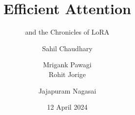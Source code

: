 \documentclass{beamer}
\title[Efficient Attention]
{Efficient Attention}
\subtitle{
    and the Chronicles of LoRA
}
\author[Chaudhary, Pawagi, Jorige, Nagasai]
{
    Sahil Chaudhary \and Mrigank Pawagi \\ Rohit Jorige \and Jajapuram Nagasai
}
\institute[]
{Indian Institute of Science}
\date[12 April 2024]
{12 April 2024}
\begin{document}
\frame{\titlepage}
\end{document}
